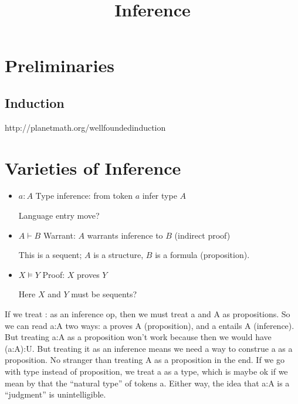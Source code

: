 \documentclass{article}
\begin{document}
\title{Inference}
\maketitle
\large

\tableofcontents

\section{Preliminaries}

\subsection{Induction}

http://planetmath.org/wellfoundedinduction

\section{Varieties of Inference}

\begin{itemize}
\item \(a{:}A\) \quad Type inference: from token \(a\) infer type \(A\)

  Language entry move?
\item \(A\vdash B\) \quad Warrant:  \(A\) warrants inference to \(B\) (indirect proof)

  This is a sequent; \(A\) is a structure, \(B\) is a formula (proposition).
\item \(X\models Y\) \quad Proof:  \(X\) proves \(Y\)

  Here \(X\) and \(Y\) must be sequents?
\end{itemize}

\begin{remark}
  If we treat : as an inference op, then we must treat a and A as
  propositions.  So we can read a:A two ways: a proves A
  (proposition), and a entails A (inference).  But treating a:A as a
  proposition won't work because then we would have (a:A):U.  But
  treating it as an inference means we need a way to construe a as a
  proposition.  No stranger than treating A as a proposition in the
  end.  If we go with type instead of proposition, we treat a as a
  type, which is maybe ok if we mean by that the ``natural type'' of
  tokens a.  Either way, the idea that a:A is a ``judgment'' is
  unintelligible.
\end{remark}

\end{document}
